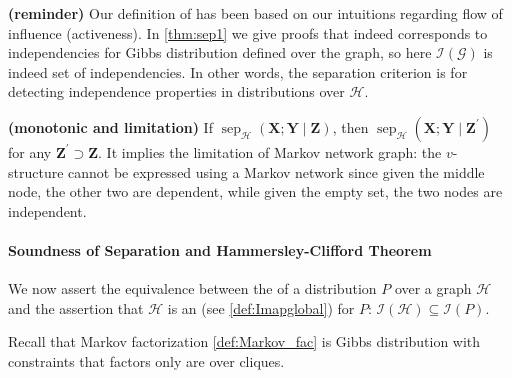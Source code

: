 \documentclass{article}
\newcommand{\bfs}[1]{\textbf{({#1}) }}
\begin{document}
\begin{rema}\bfs{reminder}
Our definition of  has been based on our intuitions regarding flow of influence (activeness). In \cref{thm:sep1} we give proofs that  indeed corresponds to independencies for Gibbs distribution defined over the graph, so here $\mathcal{I}(\mathcal{G})$ is indeed set of independencies. In other words, the separation criterion is  for detecting independence properties in distributions over $\mathcal{H}$.
\end{rema}

\begin{rema}\bfs{monotonic and limitation}
If $\operatorname{sep}_{\mathcal{H}}(\boldsymbol{X} ; \boldsymbol{Y} \mid \boldsymbol{Z})$, then $\operatorname{sep}_{\mathcal{H}}\left(\boldsymbol{X} ; \boldsymbol{Y} \mid \boldsymbol{Z}^{\prime}\right)$ for any $\boldsymbol{Z}^{\prime} \supset \boldsymbol{Z}$.  It implies the limitation of Markov network graph: the {$v$-structure} cannot be expressed using a Markov network since  given the middle node, the other two are dependent, while given the empty set, the two nodes are independent.
\end{rema}
\paragraph{Soundness of Separation and Hammersley-Clifford Theorem}\label{sec:mdrfefa}
We now assert the equivalence between the  of a distribution $P$ over a graph $\mathcal{H}$ and the assertion that $\mathcal{H}$ is an  (see \cref{def:Imapglobal}) for $P$: $\mathcal{I}(\mathcal{H}) \subseteq \mathcal{I}(P)$.
\begin{rema}
Recall that Markov factorization \cref{def:Markov_fac} is Gibbs distribution with constraints that factors only are over cliques.
\end{rema}
\end{document}

